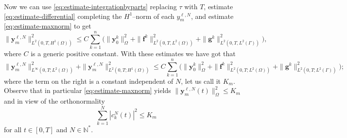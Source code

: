 \documentclass[11pt]{article}
\newcommand{\N}{\mathbb{N}}
\newcommand{\by}{\mathbf{y}}
\begin{document}
	Now we can use \eqref{eq:estimate-integrationbyparts} replacing \(\tau\) with \(T\), estimate \eqref{eq:estimate-differential} completing the \(H^1\)--norm of each \(y_m^{\ell,N}\), and estimate \eqref{eq:estimate-maxnorm} to get
	\[
		\|\by_m^{\ell,N} \|^2_{L^2(0,T, H^1(\Omega))}
		\leq 
		C \sum_{k=1}^n \bigg(  \| \by_0^k \|^2_\Omega + \|\mathbf{f}^k\|^2_{L^2(0,T, L^2(\Omega))} + \|\mathbf{g}^k\|^2_{L^2(0,T, L^2(\Gamma))} \bigg),
	\]
	where \(C\) is a generic positive constant. With these estimates we have got that
	\[
		\| \by_m^{\ell,N} \|^2_{L^\infty (0,T;L^2(\Omega) )} 
		+ \|\by_m^{\ell,N} \|^2_{L^2(0,T;H^1(\Omega))}
		\leq 
		C \sum_{k=1}^n \bigg(  \| \by_0^k \|^2_\Omega + \|\mathbf{f}^k\|^2_{L^2(0,T;L^2(\Omega))} + \|\mathbf{g}^k\|^2_{L^2(0,T;L^2(\Gamma))} \bigg);
	\]
	where the term on the right is a constant independent of \(N\), let us call it \(K_{m}\). 
	Observe that in particular \eqref{eq:estimate-maxnorm} yields \( \|\by_m^{\ell,N}(t)\|_{\Omega}^2 \leq K_{m} \) and in view of the orthonormality
	\begin{equation}
	\label{eq:boundness-of-coeffs}
		\sum_{k=1}^N |c_k^N(t)|^2 \leq K_{m}
	\end{equation}
	for all \(t\in [0,T]\) and \( N \in \N^*\).
	
\end{document}
